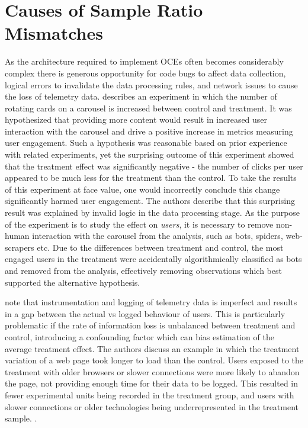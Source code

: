 \documentclass[11pt]{article}
\begin{document}
\section{Causes of Sample Ratio Mismatches}
\label{sec:causes_of_srms}
As the architecture required to implement OCEs often becomes considerably complex there is generous opportunity for code bugs to affect data collection, logical errors to invalidate the data processing rules, and network issues to cause the loss of telemetry data.
\cite{fabijan} describes an experiment in which the number of rotating cards on a carousel is increased between control and treatment.
It was hypothesized that providing more content would result in increased user interaction with the carousel and drive a positive increase in metrics measuring user engagement. Such a hypothesis was reasonable based on prior experience with related experiments, yet the surprising outcome of this experiment showed that the treatment effect was significantly negative - the number of clicks per user appeared to be much less  for the treatment than the control. To take the results of this experiment at face value, one would incorrectly conclude this change significantly harmed user engagement. The authors describe that this surprising result was explained by invalid logic in the data processing stage. As the purpose of the experiment is to study the effect on \textit{users}, it is necessary to remove non-human interaction with the carousel from the analysis, such as bots, spiders, web-scrapers etc. Due to the differences between treatment and control, the most engaged users in the treatment were accidentally algorithmically classified as bots and removed from the analysis, effectively removing observations which best supported the alternative hypothesis. 

\cite{zhao} note that instrumentation and logging of telemetry data is imperfect and results in a gap between the actual vs logged behaviour of users. This is particularly problematic if the rate of information loss is unbalanced between treatment and control, introducing a confounding factor which can bias estimation of the average treatment effect. The authors discuss an example in which the treatment variation of a web page took longer to load than the control. Users exposed to the treatment with older browsers or slower connections were more likely to abandon the page, not providing enough time for their data to be logged. This resulted in fewer experimental units being recorded in the treatment group, and users with slower connections or older technologies being underrepresented in the treatment sample.
.
\end{document}
